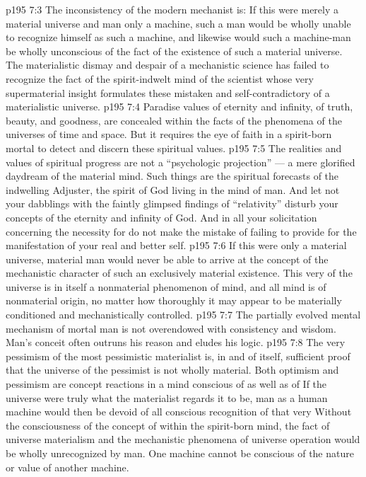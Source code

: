 \vs p195 7:3 The inconsistency of the modern mechanist is: If this were merely a material universe and man only a machine, such a man would be wholly unable to recognize himself as such a machine, and likewise would such a machine\hyp{}man be wholly unconscious of the fact of the existence of such a material universe. The materialistic dismay and despair of a mechanistic science has failed to recognize the fact of the spirit\hyp{}indwelt mind of the scientist whose very supermaterial insight formulates these mistaken and self\hyp{}contradictory  of a materialistic universe.
\vs p195 7:4 Paradise values of eternity and infinity, of truth, beauty, and goodness, are concealed within the facts of the phenomena of the universes of time and space. But it requires the eye of faith in a spirit\hyp{}born mortal to detect and discern these spiritual values.
\vs p195 7:5 The realities and values of spiritual progress are not a “psychologic projection” --- a mere glorified daydream of the material mind. Such things are the spiritual forecasts of the indwelling Adjuster, the spirit of God living in the mind of man. And let not your dabblings with the faintly glimpsed findings of “relativity” disturb your concepts of the eternity and infinity of God. And in all your solicitation concerning the necessity for  do not make the mistake of failing to provide for  the manifestation of your real and better self.
\vs p195 7:6 If this were only a material universe, material man would never be able to arrive at the concept of the mechanistic character of such an exclusively material existence. This very  of the universe is in itself a nonmaterial phenomenon of mind, and all mind is of nonmaterial origin, no matter how thoroughly it may appear to be materially conditioned and mechanistically controlled.
\vs p195 7:7 The partially evolved mental mechanism of mortal man is not overendowed with consistency and wisdom. Man’s conceit often outruns his reason and eludes his logic.
\vs p195 7:8 The very pessimism of the most pessimistic materialist is, in and of itself, sufficient proof that the universe of the pessimist is not wholly material. Both optimism and pessimism are concept reactions in a mind conscious of  as well as of  If the universe were truly what the materialist regards it to be, man as a human machine would then be devoid of all conscious recognition of that very  Without the consciousness of the concept of  within the spirit\hyp{}born mind, the fact of universe materialism and the mechanistic phenomena of universe operation would be wholly unrecognized by man. One machine cannot be conscious of the nature or value of another machine.
